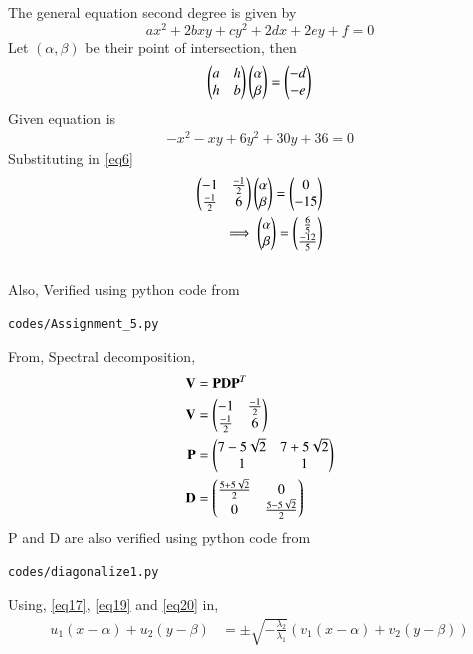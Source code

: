 \documentclass[journal,12pt,twocolumn]{IEEEtran}
\begin{document}
The general equation second degree is given by
\begin{equation}\label{eq5}
	ax^2 + 2bxy + cy^2 + 2dx + 2ey + f = 0
\end{equation}
Let $(\alpha,\beta)$ be their point of intersection, then
\begin{equation}\label{eq6}
	\begin{pmatrix} a & h\\ h & b\end{pmatrix}\begin{pmatrix}\alpha \\ \beta\end{pmatrix} = \begin{pmatrix}-d \\ -e\end{pmatrix}
\end{equation}
Given equation is
\begin{align}
	-x^2-xy+6y^2+30y+36=0
\end{align}
Substituting in \eqref{eq6}
\begin{align}
	\label{eq16}\begin{pmatrix} -1 & \frac{-1}{2}\\\frac{-1}{2} & 6\end{pmatrix}\begin{pmatrix}\alpha \\ \beta\end{pmatrix} = \begin{pmatrix}0 \\ -15\end{pmatrix} \\
	\label{eq17}\implies \begin{pmatrix}\alpha \\ \beta\end{pmatrix} =\begin{pmatrix}\frac{6}{5} \\ \frac{-12}{5}\end{pmatrix}
\end{align}
\\
Also, Verified using python code from
\begin{lstlisting}
codes/Assignment_5.py
\end{lstlisting}
From, Spectral decomposition,
\begin{align}
	\mathbf{V} &= \mathbf{P}\mathbf{D}\mathbf{P}^T\\
	\label{eq18}\mathbf{V} &= \begin{pmatrix} -1 & \frac{-1}{2}\\\frac{-1}{2} & 6\end{pmatrix}\\
	\label{eq19}\mathbf{P} &= \begin{pmatrix}7-5 \sqrt{2} & 7+5 \sqrt{2}\\ 1 & 1\end{pmatrix}\\
	\label{eq20}\mathbf{D} &= \begin{pmatrix}\frac{5+5\sqrt{2}}{2} & 0\\ 0 & \frac{5-5\sqrt{2}}{2}\end{pmatrix}
\end{align}
P and D are also verified using python code from
\begin{lstlisting}
codes/diagonalize1.py
\end{lstlisting}
Using, \eqref{eq17}, \eqref{eq19} and \eqref{eq20} in,
\begin{align}
	u_1(x-\alpha) + u_2(y-\beta) &= \pm \sqrt{-\frac{\lambda_2}{\lambda_1}}(v_1(x-\alpha) + v_2(y-\beta))\label{eq14}
\end{align}
\end{document}
